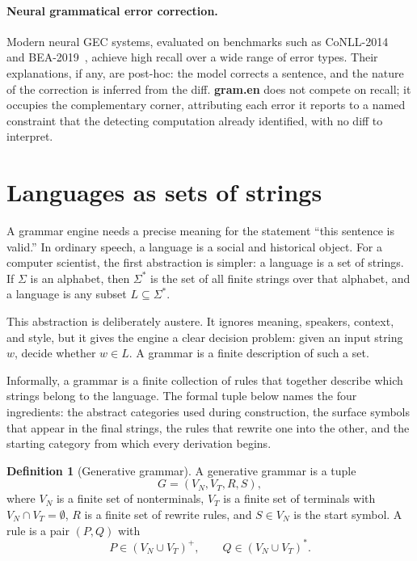 \documentclass[11pt]{article}
\theoremstyle{definition}
\newtheorem{definition}{Definition}[section]
\theoremstyle{plain}
\theoremstyle{remark}
\newcommand{\Star}[1]{{#1}^{*}}
\newcommand{\Gram}{\textbf{gram.en}}
\begin{document}
\paragraph{Neural grammatical error correction.}
Modern neural GEC systems, evaluated on benchmarks such as CoNLL-2014~\cite{ng2014conll}
and BEA-2019~\cite{bryant2019bea}, achieve high recall over a wide range of error types.
Their explanations, if any, are post-hoc: the model corrects a sentence, and the nature
of the correction is inferred from the diff. \Gram{} does not compete on recall; it
occupies the complementary corner, attributing each error it reports to a named
constraint that the detecting computation already identified, with no diff to interpret.

\section{Languages as sets of strings}

A grammar engine needs a precise meaning for the statement ``this sentence is valid.'' In
ordinary speech, a language is a social and historical object. For a computer scientist, the
first abstraction is simpler: a language is a set of strings. If $\Sigma$ is an alphabet, then
$\Star{\Sigma}$ is the set of all finite strings over that alphabet, and a language is any
subset $L \subseteq \Star{\Sigma}$.

This abstraction is deliberately austere. It ignores meaning, speakers, context, and style, but it gives the engine a clear decision problem: given an input string $w$, decide whether
$w \in L$. A grammar is a finite description of such a set.

Informally, a grammar is a finite collection of rules that together describe
which strings belong to the language. The formal tuple below names the four
ingredients: the abstract categories used during construction, the surface symbols
that appear in the final strings, the rules that rewrite one into the other, and
the starting category from which every derivation begins.

\begin{definition}[Generative grammar]
A generative grammar is a tuple
\[
  G = (V_N, V_T, R, S),
\]
where $V_N$ is a finite set of nonterminals, $V_T$ is a finite set of terminals with
$V_N \cap V_T = \emptyset$, $R$ is a finite set of rewrite rules, and $S \in V_N$ is the
start symbol. A rule is a pair $(P,Q)$ with
\[
  P \in (V_N \cup V_T)^+,
  \qquad
  Q \in (V_N \cup V_T)^*.
\]
\end{definition}
\end{document}
